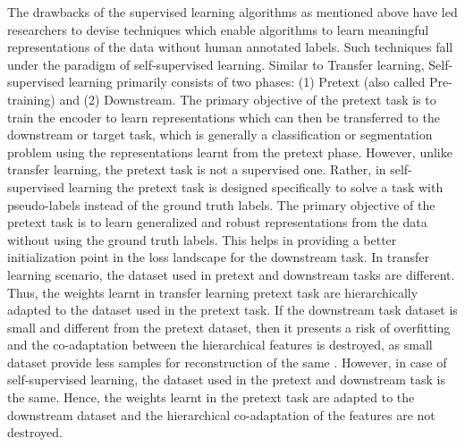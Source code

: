 \documentclass[journal]{IEEEtai}
\begin{document}
The drawbacks of the supervised learning algorithms as mentioned above have led researchers to devise techniques which enable algorithms to learn meaningful representations of the data without human annotated labels. Such techniques fall under the paradigm of self-supervised learning. Similar to Transfer learning, Self-supervised learning primarily consists of two phases: (1) Pretext (also called Pre-training) and (2) Downstream. The primary objective of the pretext task is to train the encoder to learn representations which can then be transferred to the downstream or target task, which is generally a classification or segmentation problem using the representations learnt from the pretext phase. However, unlike transfer learning, the pretext task is not a supervised one. Rather, in self-supervised learning the pretext task is designed specifically to solve a task with pseudo-labels instead of the ground truth labels. The primary objective of the pretext task is to learn generalized and robust representations from the data without using the ground truth labels. This helps in providing a better initialization point in the loss landscape for the downstream task. In transfer learning scenario, the dataset used in pretext and downstream tasks are different. Thus, the weights learnt in transfer learning pretext task are hierarchically adapted to the dataset used in the pretext task. If the downstream task dataset is small and different from the pretext dataset, then it presents a risk of overfitting and the co-adaptation between the hierarchical features is destroyed, as small dataset provide less samples for reconstruction of the same \cite{howtr}. However, in case of self-supervised learning, the dataset used in the pretext and downstream task is the same. Hence, the weights learnt in the pretext task are adapted to the downstream dataset and the hierarchical co-adaptation of the features are not destroyed.
\end{document}
